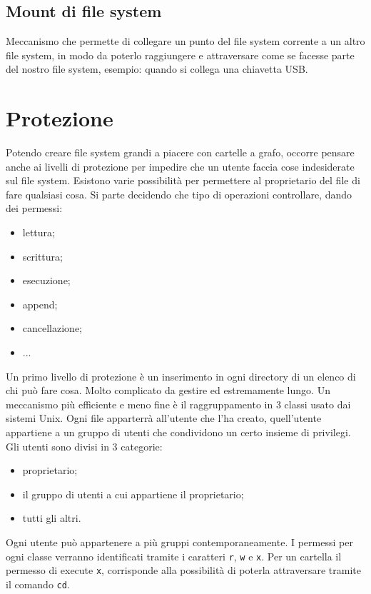\documentclass[a4paper, 12pt]{book}
\begin{document}
\subsection{Mount di file system}

Meccanismo che permette di collegare un punto del 
file system corrente a un altro file system, in modo 
da poterlo raggiungere e attraversare come se facesse 
parte del nostro file system, esempio: quando si collega 
una chiavetta USB.

\section{Protezione}

Potendo creare file system grandi a piacere con cartelle 
a grafo, occorre pensare anche ai livelli di protezione 
per impedire che un utente faccia cose indesiderate sul file 
system. Esistono varie possibilità per permettere al proprietario 
del file di fare qualsiasi cosa. Si parte decidendo che tipo di 
operazioni controllare, dando dei permessi:
\begin{itemize}
    \item lettura;
    \item scrittura;
    \item esecuzione;
    \item append;
    \item cancellazione;
    \item ...
\end{itemize}
Un primo livello di protezione è un inserimento in ogni 
directory di un elenco di chi può fare cosa. Molto 
complicato da gestire ed estremamente lungo. Un meccanismo 
più efficiente e meno fine è il raggruppamento in 3 classi
usato dai sistemi Unix. Ogni file apparterrà all'utente che
l'ha creato, quell'utente appartiene a un gruppo di utenti 
che condividono un certo insieme di privilegi. Gli 
utenti sono divisi in 3 categorie:
\begin{itemize}
    \item proprietario;
    \item il gruppo di utenti a cui appartiene il proprietario;
    \item tutti gli altri.
\end{itemize}
Ogni utente può appartenere a più gruppi contemporaneamente.
I permessi per ogni classe verranno identificati tramite 
i caratteri \verb|r|, \verb|w| e \verb|x|. Per un cartella 
il permesso di execute \verb|x|, corrisponde alla possibilità 
di poterla attraversare tramite il comando \verb|cd|.
\end{document}
